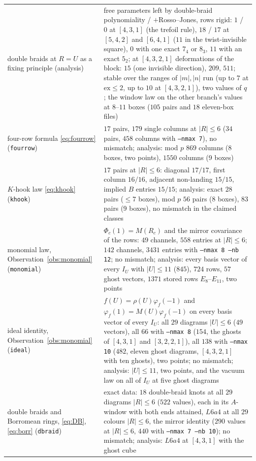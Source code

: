 \documentclass[11pt]{article}
\newcommand{\LMPH}[1]{\texttt{#1}}
\begin{document}
\begin{longtable}{p{}p{}}
double braids at $R=U$ as a fixing principle (analysis) & free parameters left by double-braid polynomiality / $+$Rosso--Jones, rows rigid: $1$ / $0$ at $[4,3,1]$ (the trefoil rule), $18$ / $17$ at $[5,4,2]$ and $[6,4,1]$ ($11$ in the twist-invisible square), $0$ with one exact $7_4$ or $8_3$, $11$ with an exact $5_2$; at $[4,3,2,1]$ deformations of the block: $15$ (one invisible direction), $209$, $511$; stable over the ranges of $|m|,|n|$ run (up to $7$ at $\mathrm{ex}\le2$, up to $10$ at $[4,3,2,1]$), two values of $q$; the window law on the other branch's values at $8$--$11$ boxes ($105$ pairs and $18$ eleven-box files)\\
four-row formula \eqref{eq:fourrow} (\LMPH{fourrow}) & $17$ pairs, $179$ single columns at $|R|\le6$ ($34$ pairs, $458$ columns with \LMPH{--nmax 7}), no mismatch; analysis: mod $p$ $869$ columns (8 boxes, two points), $1550$ columns (9 boxes)\\
$K$-hook law \eqref{eq:khook} (\LMPH{khook}) & $17$ pairs at $|R|\le6$: diagonal $17/17$, first column $16/16$, adjacent non-landing $15/15$, implied $B$ entries $15/15$; analysis: exact $28$ pairs ($\le7$ boxes), mod $p$ $56$ pairs (8 boxes), $83$ pairs (9 boxes), no mismatch in the claimed classes\\
monomial law, Observation~\ref{obs:monomial} (\LMPH{monomial}) & $\Phi_c(1)=M(R_c)$ and the mirror covariance of the rows: $49$ channels, $558$ entries at $|R|\le6$; $142$ channels, $3431$ entries with \LMPH{--nmax 8 --nb 12}; no mismatch; analysis: every basis vector of every $I_U$ with $|U|\le11$ ($845$), $724$ rows, $57$ ghost vectors, $1371$ stored rows $E_8$--$E_{11}$, two points\\
ideal identity, Observation~\ref{obs:monomial} (\LMPH{ideal}) & $f(U)=\rho(U)\varphi_f(-1)$ and $\varphi_f(1)=M(U)\varphi_f(-1)$ on every basis vector of every $I_U$: all $29$ diagrams $|U|\le6$ ($49$ vectors), all $66$ with \LMPH{--nmax 8} ($154$, the ghosts of $[4,3,1]$ and $[3,2,2,1]$), all $138$ with \LMPH{--nmax 10} ($482$, eleven ghost diagrams, $[4,3,2,1]$ with ten ghosts), two points; no mismatch; analysis: $|U|\le11$, two points, and the vacuum law on all of $I_U$ at five ghost diagrams\\
double braids and Borromean rings, \eqref{eq:DB}, \eqref{eq:borr} (\LMPH{dbraid}) & exact data: $18$ double-braid knots at all $29$ diagrams $|R|\le6$ ($522$ values), each in its $A$-window with both ends attained, $L6a4$ at all $29$ colours $|R|\le6$, the mirror identity ($290$ values at $|R|\le6$, $440$ with \LMPH{--nmax 7 --nb 10}); no mismatch; analysis: $L6a4$ at $[4,3,1]$ with the ghost cube\\

\end{longtable}
\end{document}
